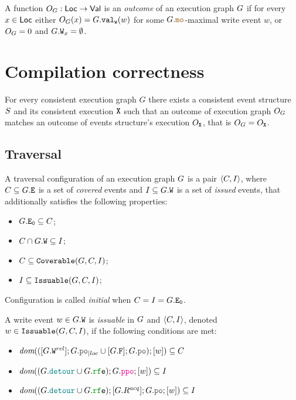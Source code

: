 \documentclass[12pt]{article}
\begin{document}
\begin{definition}
  A function $O_{G} : \mathsf{Loc} \rightarrow \mathsf{Val}$ is an \emph{outcome} of an \imm execution graph $G$
  if for every $x \in \mathsf{Loc}$ either $O_{G}(x) = G.{\mathtt{val_w}}(w)$ 
  for some $\lG.\lMO$-maximal write event $w$, 
  or $O_{G} = 0$ and $G.{\mathtt{W}}_x = \emptyset$.
\end{definition}

\section{Compilation correctness}

\begin{theorem}
  For every consistent \imm execution graph $G$
  there exists a consistent event structure $S$ and its consistent execution ${\mathtt{X}}$
  such that an outcome of execution graph $O_{G}$ matches
  an outcome of events structure's execution $O_{{\mathtt{X}}}$, 
  that is $O_{G} = O_{{\mathtt{X}}}$.
\end{theorem}

\subsection{Traversal}

\begin{definition}
  A traversal configuration of an execution graph $G$ is a pair $\langle C, I \rangle$, 
  where $C \subseteq G.{\mathtt{E}}$ is a set of \emph{covered} events 
  and $I \subseteq G.{\mathtt{W}}$ is a set of \emph{issued} events,
  that additionally satisfies the following properties:
  \begin{itemize}
    \item $G.{\mathtt{E_0}} \subseteq C$;
    \item $C \cap G.{\mathtt{W}} \subseteq I$;
    \item $C \subseteq {\mathtt{Coverable}}(G, C, I)$;
    \item $I \subseteq {\mathtt{Issuable}}(G, C, I)$;
  \end{itemize}
  Configuration is called \emph{initial} when $C = I = G.{\mathtt{E_0}}$.
\end{definition}

\begin{definition}
  A write event $w \in G.{\mathtt{W}}$ is \emph{issuable} in $G$ and $\langle C, I \rangle$,
  denoted $w \in {\mathtt{Issuable}}(G, C, I)$, 
  if the following conditions are met:
  \begin{itemize}
    \item $\dom{([\lG.\lW^{rel}];\lmakeLoc{\lG.\lPO} \cup [\lG.\lF];\lG.\lPO);[w]} \subseteq \lC$
    \item $\dom{(\lG.\lDETOUR \cup \lG.\lRFE);\lG.\lPPO;[w]} \subseteq \lI$
    \item $\dom{(\lG.\lDETOUR \cup \lG.\lRFE);[\lG.R^{acq}];\lG.\lPO;[w]} \subseteq \lI$
  \end{itemize}
\end{definition}
\end{document}
